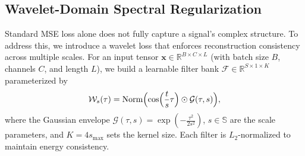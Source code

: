\documentclass[conference]{IEEEtran}
\begin{document}






\subsection{Wavelet-Domain Spectral Regularization}
\label{subsec:wavelet}

Standard MSE loss alone does not fully capture a signal's complex structure. To address this, we introduce a wavelet loss that enforces reconstruction consistency across multiple scales. For an input tensor $\mathbf{x}\in\mathbb{R}^{B\times C\times L}$ (with batch size $B$, channels $C$, and length $L$), we build a learnable filter bank $\mathcal{F}\in\mathbb{R}^{S\times 1\times K}$ parameterized by
\begin{equation}
    \label{eq:wavelet}
    \mathcal{W}_s(\tau) = \operatorname{Norm}\Bigl(\cos\Bigl(\frac{t}{s}\tau\Bigr) \odot \mathcal{G}(\tau,s)\Bigr),
\end{equation}
where the Gaussian envelope $\mathcal{G}(\tau,s)=\exp\left(-\frac{\tau^2}{2s^2}\right)$, $s\in\mathbb{S}$ are the scale parameters, and $K=4s_{\text{max}}$ sets the kernel size. Each filter is $L_2$-normalized to maintain energy consistency.
\end{document}
